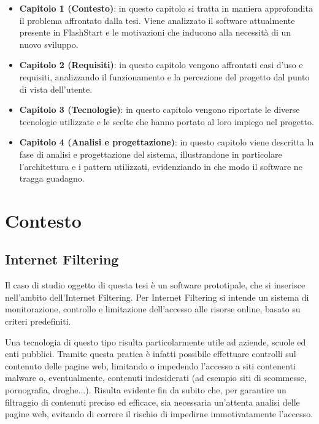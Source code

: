 \documentclass[12pt,a4paper,openright,twoside]{book}
\begin{document}
\begin{itemize}

    \item \textbf{Capitolo 1 (Contesto)}: in questo capitolo si tratta in maniera approfondita il problema affrontato dalla tesi.
    Viene analizzato il software attualmente presente in FlashStart e le motivazioni che inducono alla necessità di un nuovo sviluppo.
    
    \item \textbf{Capitolo 2 (Requisiti)}: in questo capitolo vengono affrontati casi d'uso e requisiti, analizzando il funzionamento e la percezione del progetto dal punto di vista dell'utente.
    
    \item \textbf{Capitolo 3 (Tecnologie)}:
    in questo capitolo vengono riportate le diverse tecnologie utilizzate e le scelte che hanno portato al loro impiego nel progetto.
    
    \item \textbf{Capitolo 4 (Analisi e progettazione)}:
    in questo capitolo viene descritta la fase di analisi e progettazione del sistema,
    illustrandone in particolare l'architettura e i pattern utilizzati, evidenziando in che modo il software ne tragga guadagno.

\end{itemize}

\mainmatter

\chapter{Contesto}
\label{chap:contesto}

\section{Internet Filtering}

Il caso di studio oggetto di questa tesi è un software prototipale, che si inserisce nell'ambito dell'Internet Filtering.
Per Internet Filtering si intende un sistema di monitorazione, controllo e limitazione dell'accesso alle risorse online, basato su criteri predefiniti.

Una tecnologia di questo tipo risulta particolarmente utile ad aziende, scuole ed enti pubblici.
Tramite questa pratica è infatti possibile effettuare controlli sul contenuto delle pagine web, limitando o impedendo l'accesso a siti contenenti malware o, eventualmente, contenuti indesiderati (ad esempio siti di scommesse, pornografia, droghe...).
Risulta evidente fin da subito che, per garantire un filtraggio di contenuti preciso ed efficace, sia necessaria un'attenta analisi delle pagine web, evitando di correre il rischio di impedirne immotivatamente l'accesso.
\end{document}
